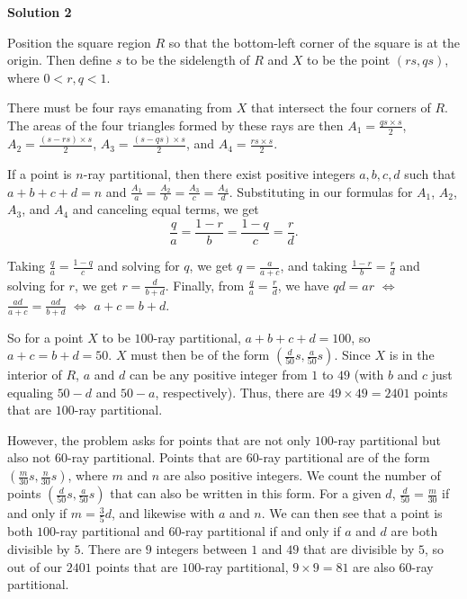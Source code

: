 \begin{enumerate}
 



\textbf{Solution 2}

Position the square region $R$ so that the bottom-left corner of the square is at the origin. Then define $s$ to be the sidelength of $R$ and $X$ to be the point $(rs, qs)$, where $0<r,q<1$. 

 
There must be four rays emanating from $X$ that intersect the four corners of $R$. The areas of the four triangles formed by these rays are then $A_1=\frac{qs\times s}{2}$, $A_2=\frac{(s-rs)\times s}{2}$, $A_3=\frac{(s-qs)\times s}{2}$, and $A_4=\frac{rs\times s}{2}$. 

 
If a point is $n$-ray partitional, then there exist positive integers $a, b, c, d$ such that $a+b+c+d=n$ and $\frac{A_1}{a}=\frac{A_2}{b}=\frac{A_3}{c}=\frac{A_4}{d}$. Substituting in our formulas for $A_1$, $A_2$, $A_3$, and $A_4$ and canceling equal terms, we get 
 \[\frac{q}{a}=\frac{1-r}{b}=\frac{1-q}{c}=\frac{r}{d}.\] 

 
Taking $\frac{q}{a}=\frac{1-q}{c}$ and solving for $q$, we get $q=\frac{a}{a+c}$, and taking $\frac{1-r}{b}=\frac{r}{d}$ and solving for $r$, we get $r=\frac{d}{b+d}$. Finally, from $\frac{q}{a}=\frac{r}{d}$, we have $qd=ar$ $\Leftrightarrow$ $\frac{ad}{a+c}=\frac{ad}{b+d}$ $\Leftrightarrow$ $a+c=b+d$. 

 
So for a point $X$ to be $100$-ray partitional, $a+b+c+d=100$, so $a+c=b+d=50$. $X$ must then be of the form $\left(\frac{d}{50}s, \frac{a}{50}s\right)$. Since $X$ is in the interior of $R$, $a$ and $d$ can be any positive integer from $1$  to $49$ (with $b$ and $c$ just equaling $50-d$ and $50-a$, respectively). Thus, there are $49\times 49=2401$ points that are $100$-ray partitional.

 
However, the problem asks for points that are not only $100$-ray partitional but also not $60$-ray partitional. Points that are $60$-ray partitional are of the form $\left(\frac{m}{30}s, \frac{n}{30}s\right)$, where $m$ and $n$ are also positive integers. We count the number of points $\left(\frac{d}{50}s, \frac{a}{50}s\right)$ that can also be written in this form. For a given $d$, $\frac{d}{50}=\frac{m}{30}$ if and only if $m=\frac{3}{5}d$, and likewise with $a$ and $n$. We can then see that a point is both $100$-ray partitional and $60$-ray partitional if and only if $a$ and $d$ are both divisible by $5$. There are $9$ integers between $1$ and $49$ that are divisible by $5$, so out of our $2401$ points that are $100$-ray partitional, $9\times 9=81$ are also $60$-ray partitional.


\end{enumerate}
